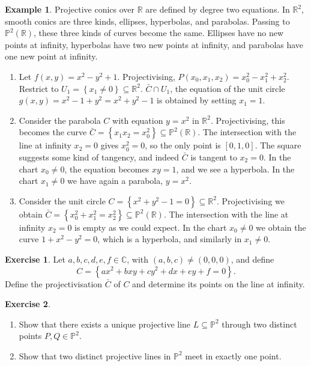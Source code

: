 \documentclass{article}
\newcommand{\R}{\mathbb{R}}
\newcommand{\C}{\mathbb{C}}
\renewcommand{\P}{\mathbb{P}}
\newcommand{\rb}[1]{\left( #1 \right)}
\renewcommand{\sb}[1]{\left[ #1 \right]}
\newcommand{\cb}[1]{\left\{ #1 \right\}}
\theoremstyle{definition}\newtheorem{definition}{Definition}[section]
\theoremstyle{definition}\newtheorem{notation}[definition]{Notation}
\theoremstyle{definition}\newtheorem{remark}[definition]{Remark}
\theoremstyle{definition}\newtheorem{example}[definition]{Example}
\theoremstyle{definition}\newtheorem{fact}{Fact}
\theoremstyle{definition}\newtheorem{exercise}{Exercise}
\begin{document}
\begin{example}
Projective conics over $ \R $ are defined by degree two equations. In $ \R^2 $, smooth conics are three kinds, ellipses, hyperbolas, and parabolas. Passing to $ \P^2\rb{\R} $, these three kinds of curves become the same. Ellipses have no new points at infinity, hyperbolas have two new points at infinity, and parabolas have one new point at infinity.
\begin{enumerate}
\item Let $ f\rb{x, y} = x^2 - y^2 + 1 $. Projectivising, $ P\rb{x_0, x_1, x_2} = x_0^2 - x_1^2 + x_2^2 $. Restrict to $ U_1 = \cb{x_1 \ne 0} \subseteq \R^2 $. $ \bar{C} \cap U_1 $, the equation of the unit circle $ g\rb{x, y} = x^2 - 1 + y^2 = x^2 + y^2 - 1 $ is obtained by setting $ x_1 = 1 $.
\item Consider the parabola $ C $ with equation $ y = x^2 $ in $ \R^2 $. Projectivising, this becomes the curve $ \bar{C} = \cb{x_1x_2 = x_0^2} \subseteq \P^2\rb{\R} $. The intersection with the line at infinity $ x_2 = 0 $ gives $ x_0^2 = 0 $, so the only point is $ \sb{0, 1, 0} $. The square suggests some kind of tangency, and indeed $ \bar{C} $ is tangent to $ x_2 = 0 $. In the chart $ x_0 \ne 0 $, the equation becomes $ xy = 1 $, and we see a hyperbola. In the chart $ x_1 \ne 0 $ we have again a parabola, $ y = x^2 $.
\item Consider the unit circle $ C = \cb{x^2 + y^2 - 1 = 0} \subseteq \R^2 $. Projectivising we obtain $ \bar{C} = \cb{x_0^2 + x_1^2 = x_2^2} \subseteq \P^2\rb{\R} $. The intersection with the line at infinity $ x_2 = 0 $ is empty as we could expect. In the chart $ x_0 \ne 0 $ we obtain the curve $ 1 + x^2 - y^2 = 0 $, which is a hyperbola, and similarly in $ x_1 \ne 0 $.
\end{enumerate}
\end{example}

\begin{exercise}
Let $ a, b, c, d, e, f \in \C $, with $ \rb{a, b, c} \ne \rb{0, 0, 0} $, and define
$$ C = \cb{ax^2 + bxy + cy^2 + dx + ey + f = 0}. $$
Define the projectivisation $ \bar{C} $ of $ C $ and determine its points on the line at infinity.
\end{exercise}

\begin{exercise}
\label{ex:18}
\hfill
\begin{enumerate}
\item Show that there exists a unique projective line $ L \subseteq \P^2 $ through two distinct points $ P, Q \in \P^2 $.
\item Show that two distinct projective lines in $ \P^2 $ meet in exactly one point.
\end{enumerate}
\end{exercise}
\end{document}
